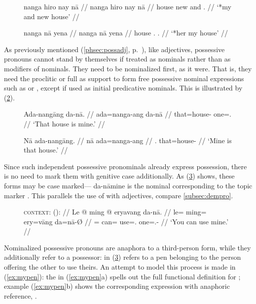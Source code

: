 \begin{figure}
\pex\label{ex:possnoadj}
\a\ljudge*\begingl
	\gla nanga hiro nay nā //
	\glb nanga hiro nay nā //
	\glc house new and \Fsg{}.\Gen{} //
	\glft `*my and new house' //
\endgl

\a\ljudge*\begingl
	\gla nanga nā yena //
	\glb nanga nā yena //
	\glc house \Fsg{}.\Gen{} \TsgF{}.\Gen{} //
	\glft `*her my house' //
\endgl
\xe
\end{figure}

As previously mentioned (\autoref{phsec:possadj}, p.~\pageref{phsec:possadj}),
like adjectives, possessive pronouns cannot stand by themselves if treated as
nominals rather than as modifiers of nominals. They need to be nominalized
first, as it were. That is, they need the proclitic  or full
 as support to form free possessive nominal expressions
such as  or , except if used as initial predicative
nominals. This is illustrated by (\ref{ex:genpred2}).

\begin{figure}
\pex\label{ex:genpred2}
\a\begingl
	\gla Ada-nangāng da-nā. //
	\glb ada=nanga-ang da-nā //
	\glc that=house-\Aarg{} one=\Fsg{}.\Gen{} //
	\glft `That house is mine.' //
\endgl

\a\begingl
	\gla Nā ada-nangāng. //
	\glb nā ada=nanga-ang //
	\glc \Fsg{}.\Gen{} that=house-\Aarg{} //
	\glft `Mine is that house.' //
\endgl
\xe
\end{figure}

Since such independent possessive pronominals already express possession, there
is no need to mark them with genitive case additionally. As
(\ref{ex:nomzposs}) shows, these forms may be case marked---
{da-nā}{mine} is the nominal corresponding to the topic marker .
This parallels the use of  with adjectives, compare
\autoref{subsec:dempro}.

\begin{figure}
\ex\label{ex:nomzposs}%
\begingl
	\glpreamble \textsc{context}:  (\Inan): //
	\gla Le @ ming @ eryavang da-nā. //
	\glb le= ming= ery=vāng da=nā-Ø //
	\glc \PatTI{}= can= use=\Second{}.\Aarg{} one=\Fsg{}.\Gen{}-\Top{} //
	\glft `You can use mine.' //
\endgl
\xe
\end{figure}

Nominalized possessive pronouns are anaphora to a
third-person form, while they additionally refer to a
possessor:  in
(\ref{ex:nomzposs}) refers to a pen belonging to the person offering the other
to use theirs. An attempt to model this process is made in (\ref{ex:mypen}): the
\Avm{} in (\ref{ex:mypen}a) spells out the full functional definition for
; example (\ref{ex:mypen}b)
shows the corresponding expression with an\-a\-pho\-ric reference,
.

